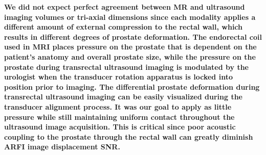 \textbf{We did not expect perfect agreement between MR and ultrasound imaging
volumes or tri-axial dimensions since each modality applies a different amount
of external compression to the rectal wall, which results in different degrees
of prostate deformation. The endorectal coil used in MRI places pressure on the
prostate that is dependent on the patient's anatomy and overall prostate size,
while the pressure on the prostate during transrectal ultrasound imaging is
modulated by the urologist when the transducer rotation apparatus is locked
into position prior to imaging.  The differential prostate deformation during
transrectal ultrasound imaging can be easily visualized during the transducer
alignment process.  It was our goal to apply as little pressure while still
maintaining uniform contact throughout the ultrasound image acquisition. This
is critical since poor acoustic coupling to the prostate through the rectal
wall can greatly diminish ARFI image displacement SNR.}
